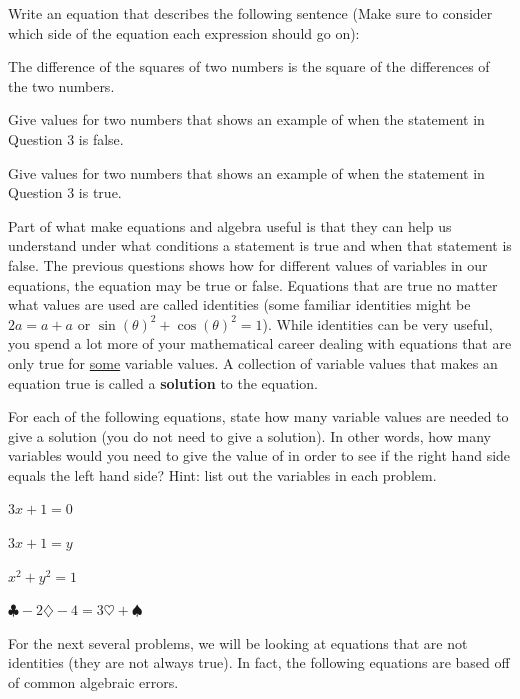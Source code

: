 \bq Write an equation that describes the following sentence (Make sure to consider which side of the equation each expression should go on):

The difference of the squares of two numbers is the square of the differences of the two numbers.
\eq

\bq \be
\item Give values for two numbers that shows an example of when the statement in Question 3 is false.
\item Give values for two numbers that shows an example of when the statement in Question 3 is true.
\ee \eq


Part of what make equations and algebra useful is that they can help us understand under what conditions a statement is true and when that statement is false. The previous questions shows how for different values of variables in our equations, the equation may be true or false. Equations that are true no matter what values are used are called identities (some familiar identities might be $2a=a+a$ or $\sin(\theta)^2 +\cos(\theta)^2=1$). While identities can be very useful, you spend a lot more of your mathematical career dealing with equations that are only true for \underline{some} variable values. A collection of variable values that makes an equation true is called a \textbf{solution} to the equation.

\bq For each of the following equations, state how many variable values are needed to give a solution (you do not need to give a solution). In other words, how many variables would you need to give the value of in order to see if the right hand side equals the left hand side? Hint: list out the variables in each problem.
\be
\item $3x+1=0$
\item $3x+1=y$
\item $x^2+y^2=1$
\item $\clubsuit-2\diamondsuit-4=3\heartsuit+\spadesuit$
\ee
\eq

For the next several problems, we will be looking at equations that are not identities (they are not always true). In fact, the following equations are based off of common algebraic errors.

